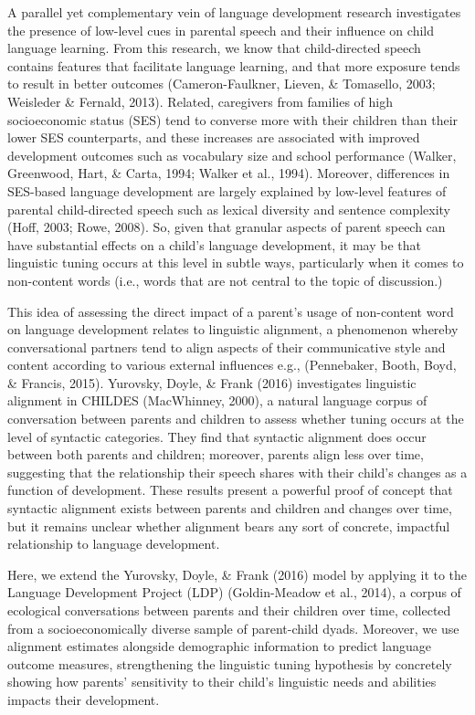 \documentclass[10pt, letterpaper]{article}
\begin{document}
A parallel yet complementary vein of language development research
investigates the presence of low-level cues in parental speech and their
influence on child language learning. From this research, we know that
child-directed speech contains features that facilitate language
learning, and that more exposure tends to result in better outcomes
(Cameron-Faulkner, Lieven, \& Tomasello, 2003; Weisleder \& Fernald,
2013). Related, caregivers from families of high socioeconomic status
(SES) tend to converse more with their children than their lower SES
counterparts, and these increases are associated with improved
development outcomes such as vocabulary size and school performance
(Walker, Greenwood, Hart, \& Carta, 1994; Walker et al., 1994).
Moreover, differences in SES-based language development are largely
explained by low-level features of parental child-directed speech such
as lexical diversity and sentence complexity (Hoff, 2003; Rowe, 2008).
So, given that granular aspects of parent speech can have substantial
effects on a child's language development, it may be that linguistic
tuning occurs at this level in subtle ways, particularly when it comes
to non-content words (i.e., words that are not central to the topic of
discussion.)

This idea of assessing the direct impact of a parent's usage of
non-content word on language development relates to linguistic
alignment, a phenomenon whereby conversational partners tend to align
aspects of their communicative style and content according to various
external influences e.g., (Pennebaker, Booth, Boyd, \& Francis, 2015).
Yurovsky, Doyle, \& Frank (2016) investigates linguistic alignment in
CHILDES (MacWhinney, 2000), a natural language corpus of conversation
between parents and children to assess whether tuning occurs at the
level of syntactic categories. They find that syntactic alignment does
occur between both parents and children; moreover, parents align less
over time, suggesting that the relationship their speech shares with
their child's changes as a function of development. These results
present a powerful proof of concept that syntactic alignment exists
between parents and children and changes over time, but it remains
unclear whether alignment bears any sort of concrete, impactful
relationship to language development.

Here, we extend the Yurovsky, Doyle, \& Frank (2016) model by applying
it to the Language Development Project (LDP) (Goldin-Meadow et al.,
2014), a corpus of ecological conversations between parents and their
children over time, collected from a socioeconomically diverse sample of
parent-child dyads. Moreover, we use alignment estimates alongside
demographic information to predict language outcome measures,
strengthening the linguistic tuning hypothesis by concretely showing how
parents' sensitivity to their child's linguistic needs and abilities
impacts their development.
\end{document}
